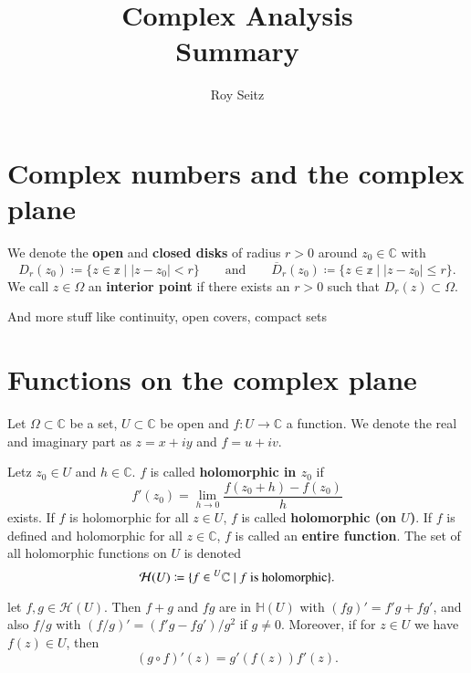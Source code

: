 

\author{Roy Seitz}
\title{Complex Analysis\\Summary}

\maketitle
\tableofcontents

\section{Complex numbers and the complex plane}
\begin{definition}
  We denote the \textbf{open} and \textbf{closed disks} of radius $r>0$ around $z_0 \in \mathbb C$ with
  \[ D_r(z_0) \coloneqq \{z \in \mathbb z \mid |z - z_0| < r\}
  \qquad\text{and}\qquad
  \overline D_r(z_0) \coloneqq \{z \in \mathbb z \mid |z - z_0| \le r\}.\]
  We call $z \in \Omega$ an \textbf{interior point} if there exists an $r > 0$ such that $D_r(z) \subset \Omega$.
\end{definition}
And more stuff like continuity, open covers, compact sets\textellipsis

\section{Functions on the complex plane}
Let $\Omega \subset \mathbb C$ be a set,
$U \subset \mathbb C$ be open
and $f\colon U \to \mathbb C$ a function.
We denote the real and imaginary part as
$z = x + iy$ and $f = u + iv$.

\begin{definition}
  Letz $z_0 \in U$ and $h \in \mathbb C$.
  $f$ is called \textbf{holomorphic in $z_0$} if
  \[f'(z_0) = \lim_{h \to 0} \frac{f(z_0 + h) - f(z_0)}{h}\]
  exists.
  If $f$ is holomorphic for all $z \in U$, $f$ is called \textbf{holomorphic (on $U$)}.
  If $f$ is defined and holomorphic for all $z \in \mathbb C$, $f$ is called an \textbf{entire function}.
  The set of all holomorphic functions on $U$ is denoted
  \[\mathcal H(U) \coloneqq \{f\in \prescript{U}{}{\mathbb C} \mid f~\text{is holomorphic} \}. \]
\end{definition}

\begin{proposition}
  let $f, g \in \mathcal H(U)$.
  Then
  $f+g$ and $fg$ are in $\mathbb H(U)$ with $(fg)' = f'g + fg'$,
  and also $f/g$ with $(f/g)' = (f'g - fg') / g^2$ if $g\ne 0$.
  Moreover, if for $z \in U$ we have $f(z) \in U$, then
  \[(g \circ f)'(z) = g'(f(z)) f'(z).\]
\end{proposition}

